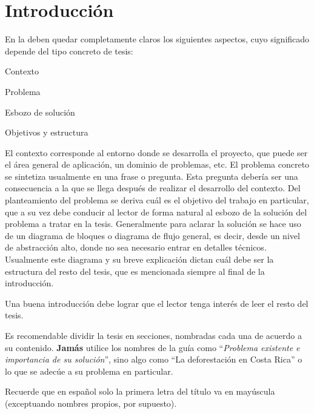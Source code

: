 
\chapter{Introducción}
\label{chp:intro}

En la  deben quedar completamente claros los siguientes
aspectos, cuyo significado depende del tipo concreto de tesis:

\begin{compactitem}
\item Contexto
\item Problema
\item Esbozo de solución
\item Objetivos y estructura
\end{compactitem}

El contexto corresponde al entorno donde se desarrolla el proyecto, que puede
ser el área general de aplicación, un dominio de problemas, etc. El problema
concreto se sintetiza usualmente en una frase o pregunta. Esta pregunta debería
ser una consecuencia a la que se llega después de realizar el desarrollo del
contexto. Del planteamiento del problema se deriva cuál es el objetivo del
trabajo en particular, que a su vez debe conducir al lector de forma natural al
esbozo de la solución del problema a tratar en la tesis. Generalmente para
aclarar la solución se hace uso de un diagrama de bloques o diagrama de flujo
general, es decir, desde un nivel de abstracción alto, donde no sea necesario
entrar en detalles técnicos. Usualmente este diagrama y su breve explicación
dictan cuál debe ser la estructura del resto del tesis, que es mencionada
siempre al final de la introducción.

Una buena introducción debe lograr que el lector tenga interés de leer el resto
del tesis.

Es recomendable dividir la tesis en secciones, nombradas cada una de acuerdo a
su contenido. \textbf{Jamás} utilice los nombres de la guía como
``\emph{Problema existente e importancia de su solución}'', sino algo como ``La
deforestación en Costa Rica'' o lo que se adecúe a su problema en particular.

Recuerde que en español solo la primera letra del título va en mayúscula
(exceptuando nombres propios, por supuesto).

